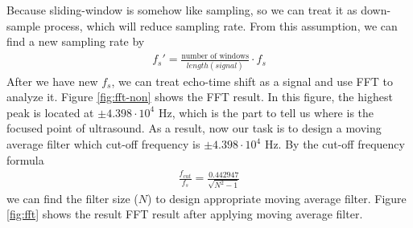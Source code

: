 \documentclass{article}
\begin{document}
Because sliding-window is somehow like sampling, so we can treat it as down-sample process, which will reduce sampling rate.
From this assumption, we can find a new sampling rate by
\begin{align*}
    f_s' = \frac{\text{number of windows}}{length(signal)} \cdot f_s
\end{align*}
After we have new $f_s$, we can treat echo-time shift as a signal and use FFT to analyze it. Figure \ref{fig:fft-non} shows the
FFT result. In this figure, the highest peak is located at $\pm 4.398 \cdot 10^4$ Hz, which is the part to tell us where
is the focused point of ultrasound. As a result, now our task is to design a moving average filter which cut-off frequency
is $\pm 4.398 \cdot 10^4$ Hz. By the cut-off frequency formula
\begin{align*}
    \frac{f_{cut}}{f_s} = \frac{0.442947}{\sqrt{N^2 - 1}}
\end{align*}
we can find the filter size ($N$) to design appropriate moving average filter. Figure \ref{fig:fft} shows the result FFT
result after applying moving average filter.
\end{document}
